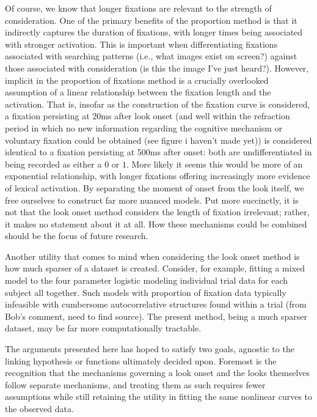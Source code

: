 \documentclass{article}
\begin{document}
Of course, we know that longer fixations are relevant to the strength of consideration. One of the primary benefits of the proportion method is that it indirectly captures the duration of fixations, with longer times being associated with stronger activation. This is important when differentiating fixations associated with searching patterns (i.e., what images exist on screen?) against those associated with consideration (is this the image I've just heard?). However, implicit in the proportion of fixations method is a crucially overlooked assumption of a linear relationship between the fixation length and the activation. That is, insofar as the construction of the fixation curve is considered, a fixation persisting at 20ms after look onset (and well within the refraction period in which no new information regarding the cognitive mechanism or voluntary fixation could be obtained (see figure i haven't made yet)) is considered identical to a fixation persisting at 500ms after onset: both are undifferentiated in being recorded as either a $0$ or $1$. More likely it seems this would be more of an exponential relationship, with longer fixations offering increasingly more evidence of lexical activation. By separating the moment of onset from the look itself, we free ourselves to construct far more nuanced models. Put more succinctly, it is not that the look onset method considers the length of fixation irrelevant; rather, it makes no statement about it at all. How these mechanisms could be combined should be the focus of future research.

Another utility that comes to mind when considering the look onset method is how much sparser of a dataset is created. Consider, for example, fitting a mixed model to the four parameter logistic modeling individual trial data for each subject all together. Such models with proportion of fixation data typically infeasible with cumbersome autocorrelative structures found within a trial (from Bob's comment, need to find source). The present method, being a much sparser dataset, may be far more computationally tractable. 


The arguments presented here has hoped to satisfy two goals, agnostic to the linking hypothesis or functions ultimately decided upon. Foremost is the recognition that the mechanisms governing a look onset and the looks themselves follow separate mechanisms, and treating them as such requires fewer assumptions while still retaining the utility in fitting the same nonlinear curves to the observed data.
\end{document}

